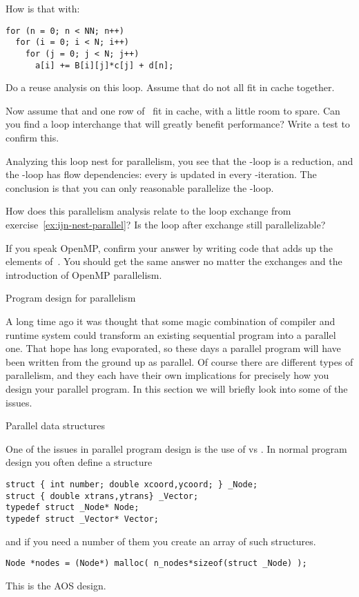 How is that with:
\lstset{language=C}
\begin{lstlisting}
for (n = 0; n < NN; n++)
  for (i = 0; i < N; i++)
    for (j = 0; j < N; j++)
      a[i] += B[i][j]*c[j] + d[n];
\end{lstlisting}

\begin{exercise}
  \label{ex:ijn-nest-parallel}
  Do a reuse analysis on this loop. Assume that  do not all
  fit in cache together.

  Now assume that  and one row of~ fit in cache, with a
  little room to spare. Can you find a loop interchange that will
  greatly benefit performance? Write a test to confirm this.
\end{exercise}

Analyzing this loop nest for parallelism, you see that the -loop
is a reduction, and the -loop has flow dependencies: every
 is updated in every -iteration. The conclusion is that
you can only reasonable parallelize the -loop.

\begin{exercise}
  How does this parallelism analysis relate to the loop exchange from
  exercise~\ref{ex:ijn-nest-parallel}? Is the loop after exchange
  still parallelizable?

  If you speak OpenMP, confirm your answer by writing code that adds
  up the elements of~. You should get the same answer no matter
  the exchanges and the introduction of OpenMP parallelism.
\end{exercise}

 {Program design for parallelism}
\label{sec:aos-soa}

A long time ago it was thought that some magic combination of 
compiler and runtime system could transform an existing sequential 
program into a parallel one. That hope has long evaporated, so these
days a parallel program will have been written from the ground up as parallel.
Of course there are different types of parallelism, and they each have
their own implications for precisely how you design your parallel program.
In this section we will briefly look into some of the issues.

 {Parallel data structures}

One of the issues in parallel program design is the use of
 vs . In normal
program design you often define a structure
\lstset{language=C}
\begin{lstlisting}
struct { int number; double xcoord,ycoord; } _Node;
struct { double xtrans,ytrans} _Vector;
typedef struct _Node* Node;
typedef struct _Vector* Vector;
\end{lstlisting}
and if you need a number of them you create an array of such structures.
\lstset{language=C}
\begin{lstlisting}
Node *nodes = (Node*) malloc( n_nodes*sizeof(struct _Node) );
\end{lstlisting}
This is the AOS design.

